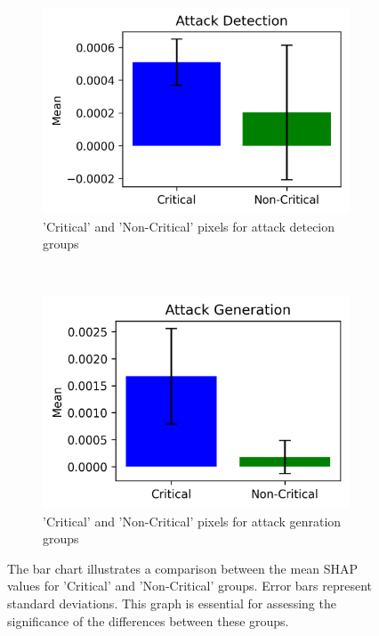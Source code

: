 \documentclass[10pt, conference, a4paper, final]{IEEEtran}
\begin{document}
\begin{figure}[h]
        \begin{subfigure}{.25\textwidth}
            \centering
            \includegraphics[width=\linewidth]{paper_images/Detectionbar_chart.png}
            \caption{'Critical' and 'Non-Critical' pixels for attack detecion groups}
        \end{subfigure}\ 
        \begin{subfigure}{.25\textwidth}
            \centering
            \includegraphics[width=\linewidth]{paper_images/Generationbar_chart.png}
            \caption{'Critical' and 'Non-Critical' pixels for attack genration groups}     
        \end{subfigure}
        \label{fig:bar_chart}
        \caption{The bar chart illustrates a comparison between the mean SHAP values  for 'Critical' and 'Non-Critical' groups. Error bars represent standard deviations. This graph is essential for assessing the significance of the differences between these groups. }
    \end{figure}
\end{document}
